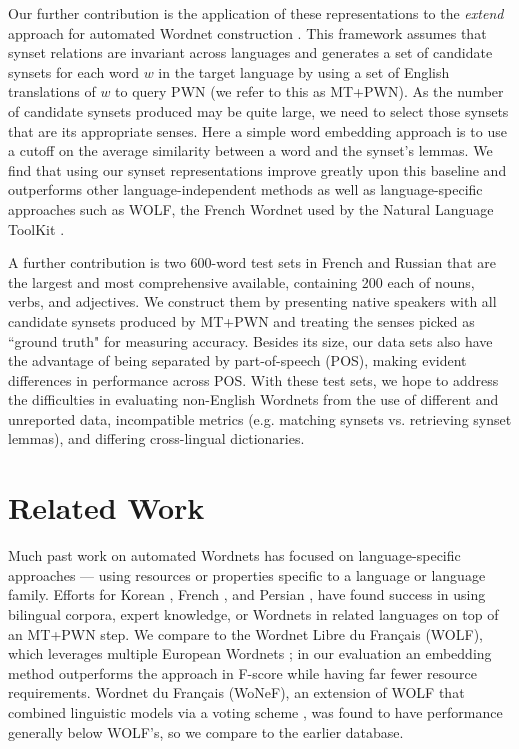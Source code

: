 \documentclass{book}
\begin{document}
Our further contribution is the application of these representations to the {\em extend} approach for automated Wordnet construction \citep{Vossen:98}.
This framework assumes that synset relations are invariant across languages and generates a set of candidate synsets for each word $w$ in the target language by using a set of English translations of $w$  to query PWN (we refer to this as MT+PWN).
As the number of candidate synsets produced may be quite large, we need to select those synsets that are its appropriate senses.
Here a simple word embedding approach is to use a cutoff on the average similarity between a word and the synset's lemmas.
We find that using our synset representations improve greatly upon this baseline and outperforms other language-independent methods as well as language-specific approaches such as WOLF, the French Wordnet used by the Natural Language ToolKit \citep{wolf,omw,nltk}.

A further contribution is two 600-word test sets in French and Russian that are the largest and most comprehensive available, containing 200 each of nouns, verbs, and adjectives.
We construct them by presenting native speakers with all candidate synsets produced by MT+PWN and treating the senses picked as ``ground truth" for measuring accuracy.
Besides its size, our data sets also have the advantage of being separated by part-of-speech (POS), making evident differences in performance across POS.
With these test sets, we hope to address the difficulties in evaluating non-English Wordnets from the use of different and unreported data, incompatible metrics (e.g. matching synsets vs. retrieving synset lemmas), and differing cross-lingual dictionaries.

\section{Related Work}
\label{sec:related}

Much past work on automated Wordnets has focused on language-specific approaches --- using resources or properties specific to a language or language family.
Efforts for Korean \citep{Lee:00}, French \citep{wolf,wonef}, and Persian \citep{Montazery:10}, have found success in using bilingual corpora, expert knowledge, or Wordnets in related languages on top of an MT+PWN step. 
We compare to the Wordnet Libre du Fran\c{c}ais (WOLF), which leverages multiple European Wordnets \citep{wolf};
in our evaluation an embedding method outperforms the approach in F-score while having far fewer resource requirements.
Wordnet du Fran\c{c}ais (WoNeF), an extension of WOLF that combined linguistic models via a voting scheme \citep{wonef}, was found to have performance generally below WOLF's, so we compare to the earlier database.
\end{document}
